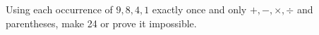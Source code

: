 Using each occurrence of $9,8,4,1$ exactly once and only $+,-,\times,\div$ and parentheses, make 24 or prove it impossible.
